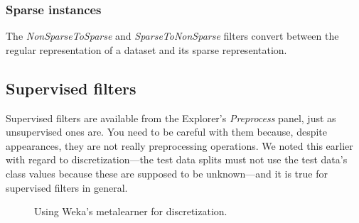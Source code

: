 \subsubsection{Sparse instances}

The \textit{NonSparseToSparse} and \textit{SparseToNonSparse} filters
convert between the regular representation of a dataset and its sparse
representation.

\subsection{Supervised filters}
\label{subsection:supervised_filters}

Supervised filters are available from the Explorer's
\textit{Preprocess} panel, just as unsupervised ones are. You need to
be careful with them because, despite appearances, they are not really
preprocessing operations. We noted this earlier with regard to
discretization---the test data splits must not use the test data’s
class values because these are supposed to be unknown---and it is true
for supervised filters in general.

\begin{figure}[!th]
\centering
{}
\qquad
{}
\caption{\label{fig:filtered_classifier}Using Weka's metalearner for discretization.}
\end{figure}

